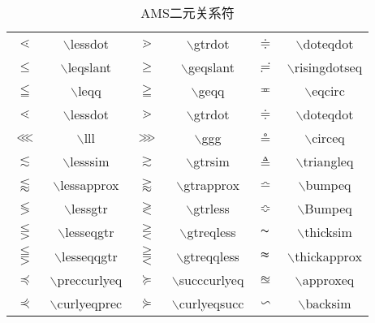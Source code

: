 \documentclass[UTF8]{ctexart}
\begin{document}
\begin{table}[H]
	\begin{center}
		\caption{AMS二元关系符}
		\begin{tabular}{cccccc}
			
			
			$\lessdot$  &  $\backslash$lessdot  &  $\gtrdot$  & $\backslash$gtrdot  &  $\doteqdot$  & $\backslash$doteqdot  \\
			
			$\leqslant$  &  $\backslash$leqslant  &  $\geqslant$  & $\backslash$geqslant  &  $\risingdotseq$  & $\backslash$risingdotseq  \\
			
			$\leqq$  &  $\backslash$leqq  &  $\geqq$  & $\backslash$geqq  &  $\eqcirc$  & $\backslash$eqcirc  \\

			$\lessdot$  &  $\backslash$lessdot  &  $\gtrdot$  & $\backslash$gtrdot  &  $\doteqdot$  & $\backslash$doteqdot  \\

			$\lll$  &  $\backslash$lll  &  $\ggg$  & $\backslash$ggg  &  $\circeq$  & $\backslash$circeq  \\

			$\lesssim$  &  $\backslash$lesssim  &  $\gtrsim$  & $\backslash$gtrsim  &  $\triangleq$  & $\backslash$triangleq  \\


			$\lessapprox$  &  $\backslash$lessapprox  &  $\gtrapprox$  & $\backslash$gtrapprox  &  $\bumpeq$  & $\backslash$bumpeq  \\

			$\lessgtr$  &  $\backslash$lessgtr  &  $\gtrless$  & $\backslash$gtrless  &  $\Bumpeq$  & $\backslash$Bumpeq  \\

			$\lesseqgtr$  &  $\backslash$lesseqgtr  &  $\gtreqless$  & $\backslash$gtreqless  &  $\thicksim$  & $\backslash$thicksim  \\


			$\lesseqqgtr$  &  $\backslash$lesseqqgtr  &  $\gtreqqless$  & $\backslash$gtreqqless  &  $\thickapprox$  & $\backslash$thickapprox  \\

			$\preccurlyeq$  &  $\backslash$preccurlyeq  &  $\succcurlyeq$  & $\backslash$succcurlyeq  &  $\approxeq$  & $\backslash$approxeq  \\

			$\curlyeqprec$  &  $\backslash$curlyeqprec  &  $\curlyeqsucc$  & $\backslash$curlyeqsucc  &  $\backsim$  & $\backslash$backsim  \\
			

\end{tabular}
\end{center}
\end{table}
\end{document}
